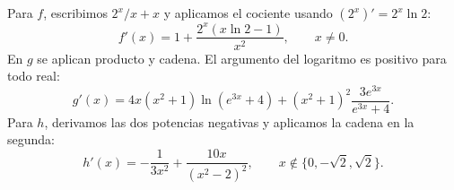 Para $f$, escribimos $2^x/x+x$ y aplicamos el cociente usando $(2^x)'=2^x\ln2$:
\[
f'(x)=1+\frac{2^x(x\ln2-1)}{x^2},
\qquad x\ne0.
\]
En $g$ se aplican producto y cadena. El argumento del logaritmo es positivo para todo real:
\[
g'(x)=4x(x^2+1)\ln(e^{3x}+4)
+(x^2+1)^2\frac{3e^{3x}}{e^{3x}+4}.
\]
Para $h$, derivamos las dos potencias negativas y aplicamos la cadena en la segunda:
\[
h'(x)=-\frac{1}{3x^2}+\frac{10x}{(x^2-2)^2},
\qquad x\notin\{0,-\sqrt2,\sqrt2\}.
\]
